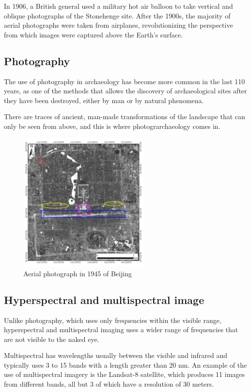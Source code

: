 In 1906, a British general used a military hot air balloon to take vertical and oblique photographs of the Stonehenge site. After the 1900s, the majority of aerial photographs were taken from airplanes, revolutionizing the perspective from which images were captured above the Earth's surface.


\subsection{Photography}
The use of photography in archaeology has become more common in the last 110 years\cite{asmr}, as one of the methods that allows the discovery of archaeological sites after they have been destroyed, either by man or by natural phenomena. 

There are traces of ancient, man-made transformations of the landscape that can only be seen from above, and this is where photograrchaeology comes in.

\begin{figure}[h]
\centering
\includegraphics[height=7cm]{images/foto.png}
\caption[Aerial photograph in 1945 of Beijing]{Aerial photograph in 1945 of Beijing \cite{asmr}}
\end{figure}

\subsection{Hyperspectral and multispectral image}
Unlike photography, which uses only frequencies within the visible range, hyperspectral and multispectral imaging uses a wider range of frequencies that are not visible to the naked eye.


Multispectral has wavelengths usually between the visible and infrared and typically uses 3 to 15 bands with a length greater than 20 nm. An example of the use of multispectral imagery is the Landsat-8 satellite, which produces 11 images from different bands, all but 3 of which have a resolution of 30 meters.

